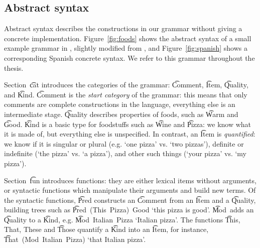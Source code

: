 \subsection{Abstract syntax}


Abstract syntax describes the constructions in our grammar without
giving a concrete implementation. Figure~\ref{fig:foods}
shows the abstract syntax of a small example grammar in \gf{}, slightly
modified from \cite{ranta2011gfbook}, and Figure~\ref{fig:spanish}
shows a corresponding Spanish concrete syntax. We refer to this
grammar throughout the thesis. 

Section~\t{cat} introduces the categories of the grammar: \t{Comment},
\t{Item},  \t{Quality}, and \t{Kind}.  \t{Comment} is the \emph{start
  category} of the grammar: this means that only comments are complete
constructions in the language, everything else is an intermediate
stage. \t{Quality} describes properties of foods, such as
\t{Warm} and \t{Good}. %
\t{Kind} is a basic type for foodstuffs such as \t{Wine} and
\t{Pizza}: we know what it is made of, but everything else is
unspecified. In contrast, an \t{Item} is \emph{quantified}: we know if
it is singular or plural (e.g. `one pizza' vs. `two pizzas'), definite or
indefinite (`the pizza' vs. `a pizza'), and other such things (`your
pizza' vs. `my pizza'). 

Section~\t{fun} introduces functions: they are either lexical
items without arguments, or syntactic functions which manipulate their
arguments and build new terms. Of the syntactic functions, \t{Pred}
constructs an \t{Comment} from an \t{Item} and a \t{Quality},
building trees such as \t{Pred~(This~Pizza)~Good} `this pizza is
good'. 
\t{Mod}~adds an \t{Quality} to a \t{Kind}, e.g. \t{Mod~Italian~Pizza}
`Italian pizza'. The functions  \t{This, That, These} 
and \t{Those} quantify a \t{Kind} into an \t{Item}, for instance,
\t{That~(Mod~Italian~Pizza)} `that Italian pizza'.

